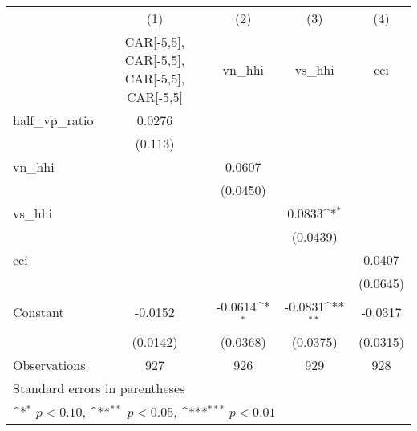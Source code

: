 {
\def\sym#1{\ifmmode^{#1}\else\(^{#1}\)\fi}
\begin{tabular}{l*{4}{c}}
\hline\hline
                    &\multicolumn{1}{c}{(1)}&\multicolumn{1}{c}{(2)}&\multicolumn{1}{c}{(3)}&\multicolumn{1}{c}{(4)}\\
                    &\multicolumn{1}{c}{CAR[-5,5], CAR[-5,5], CAR[-5,5], CAR[-5,5]}&\multicolumn{1}{c}{vn\_hhi}&\multicolumn{1}{c}{vs\_hhi}&\multicolumn{1}{c}{cci}\\
\hline
half\_vp\_ratio       &      0.0276         &                     &                     &                     \\
                    &     (0.113)         &                     &                     &                     \\
[1em]
vn\_hhi              &                     &      0.0607         &                     &                     \\
                    &                     &    (0.0450)         &                     &                     \\
[1em]
vs\_hhi              &                     &                     &      0.0833\sym{*}  &                     \\
                    &                     &                     &    (0.0439)         &                     \\
[1em]
cci                 &                     &                     &                     &      0.0407         \\
                    &                     &                     &                     &    (0.0645)         \\
[1em]
Constant            &     -0.0152         &     -0.0614\sym{*}  &     -0.0831\sym{**} &     -0.0317         \\
                    &    (0.0142)         &    (0.0368)         &    (0.0375)         &    (0.0315)         \\
\hline
Observations        &         927         &         926         &         929         &         928         \\
\hline\hline
\multicolumn{5}{l}{\footnotesize Standard errors in parentheses}\\
\multicolumn{5}{l}{\footnotesize \sym{*} \(p<0.10\), \sym{**} \(p<0.05\), \sym{***} \(p<0.01\)}\\
\end{tabular}
}
